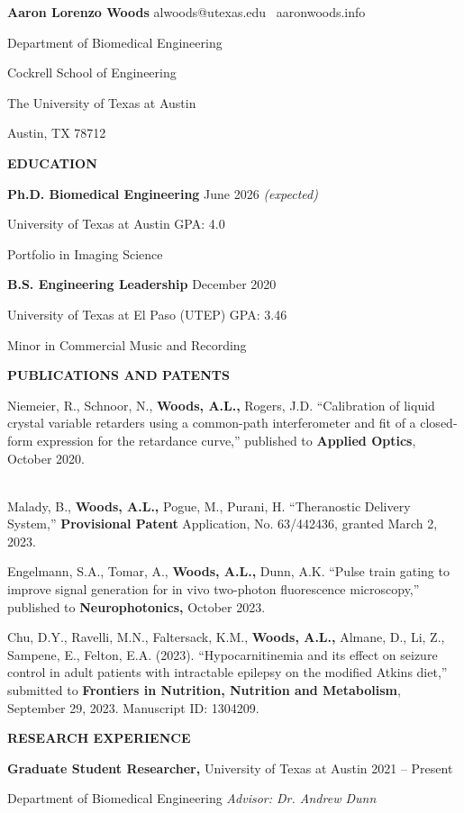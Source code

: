 \documentclass[11pt]{article}
\newcommand{\sectionheading}[1]{%
  \vspace{1.6ex}%
  {\large\bfseries\MakeUppercase{#1}}\par\vspace{0.6ex}%
}
\begin{document}
\textbf{Aaron Lorenzo Woods} alwoods@utexas.edu~\textbar{} aaronwoods.info

Department of Biomedical Engineering

Cockrell School of Engineering

The University of Texas at Austin

Austin, TX 78712

\sectionheading{EDUCATION}

\textbf{Ph.D. Biomedical Engineering} June 2026 \emph{(expected)}

University of Texas at Austin GPA: 4.0

Portfolio in Imaging Science

\textbf{B.S. Engineering Leadership} December 2020

University of Texas at El Paso (UTEP) GPA: 3.46

Minor in Commercial Music and Recording

\sectionheading{PUBLICATIONS AND PATENTS}

Niemeier, R., Schnoor, N., \textbf{Woods, A.L.,} Rogers, J.D. ``Calibration of liquid crystal variable retarders using a common-path interferometer and fit of a closed-form expression for the retardance curve,'' published to \textbf{Applied Optics}, October 2020.\\
\strut \\
Malady, B., \textbf{Woods, A.L.,} Pogue, M., Purani, H. ``Theranostic Delivery System,'' \textbf{Provisional Patent} Application, No. 63/442436, granted March 2, 2023.

Engelmann, S.A., Tomar, A., \textbf{Woods, A.L.,} Dunn, A.K. ``Pulse train gating to improve signal generation for in vivo two-photon fluorescence microscopy,'' published to \textbf{Neurophotonics,} October 2023.

Chu, D.Y., Ravelli, M.N., Faltersack, K.M., \textbf{Woods, A.L.,} Almane, D., Li, Z., Sampene, E., Felton, E.A. (2023). ``Hypocarnitinemia and its effect on seizure control in adult patients with intractable epilepsy on the modified Atkins diet,'' submitted to \textbf{Frontiers in Nutrition, Nutrition and Metabolism}, September 29, 2023. Manuscript ID: 1304209.

\sectionheading{RESEARCH EXPERIENCE}

\textbf{Graduate Student Researcher,} University of Texas at Austin 2021 -- Present

Department of Biomedical Engineering \textbar{} \emph{Advisor: Dr. Andrew Dunn}
\end{document}
